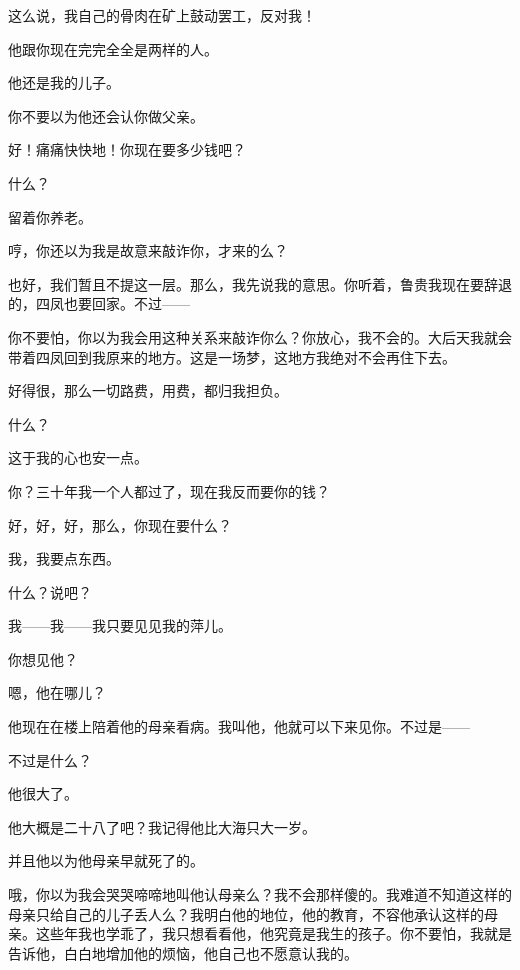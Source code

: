 这么说，我自己的骨肉在矿上鼓动罢工，反对我！

他跟你现在完完全全是两样的人。

他还是我的儿子。

你不要以为他还会认你做父亲。

好！痛痛快快地！你现在要多少钱吧？

什么？

留着你养老。

哼，你还以为我是故意来敲诈你，才来的么？

也好，我们暂且不提这一层。那么，我先说我的意思。你听着，鲁贵我现在要辞退的，四凤也要回家。不过——

你不要怕，你以为我会用这种关系来敲诈你么？你放心，我不会的。大后天我就会带着四凤回到我原来的地方。这是一场梦，这地方我绝对不会再住下去。

好得很，那么一切路费，用费，都归我担负。

什么？

这于我的心也安一点。

你？三十年我一个人都过了，现在我反而要你的钱？

好，好，好，那么，你现在要什么？

我，我要点东西。

什么？说吧？

我——我——我只要见见我的萍儿。

你想见他？

嗯，他在哪儿？

他现在在楼上陪着他的母亲看病。我叫他，他就可以下来见你。不过是——

不过是什么？

他很大了。

他大概是二十八了吧？我记得他比大海只大一岁。

并且他以为他母亲早就死了的。

哦，你以为我会哭哭啼啼地叫他认母亲么？我不会那样傻的。我难道不知道这样的母亲只给自己的儿子丢人么？我明白他的地位，他的教育，不容他承认这样的母亲。这些年我也学乖了，我只想看看他，他究竟是我生的孩子。你不要怕，我就是告诉他，白白地增加他的烦恼，他自己也不愿意认我的。

